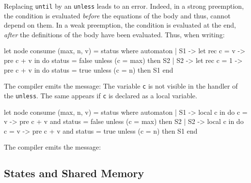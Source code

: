 \documentclass[11pt,titlepage,twoside]{report}
\makeatletter
\newenvironment{sample}
  {\@open{div}{\envclass@attr{zelusprompt}}
   \begin{alltt}}
  {\end{alltt}\@close{div}}
\newenvironment{sample}
  {\begin{flushright}\begin{minipage}[t]{15.3cm}\begin{alltt}\small}
  {\end{alltt}\end{minipage}\end{flushright}}
\makeatother
\begin{document}
Replacing \verb-until- by an \verb-unless- leads to an error. Indeed,
in a strong preemption, the condition is evaluated {\em before} the
equations of the body and thus, cannot depend on them. In a weak
preemption, the condition is evaluated at the end, {\em after} the
definitions of the body have been evaluated. Thus, when writing:
\begin{chklisting}[fail]
let node consume (max, n, v) = status where
  automaton
  | S1 ->
      let rec c = v -> pre c + v in
      do status = false
      unless (c = max) then S2
  | S2 ->
      let rec c = 1 -> pre c + v in
      do status = true
      unless (c = n) then S1
  end
\end{chklisting}
The compiler emits the message:
\chklistingerr{}
The variable \verb-c- is not visible in the handler of the \verb-unless-. The
same appears if \verb-c- is declared as a local variable.
\begin{chklisting}[fail]
let node consume (max, n, v) = status where
  automaton
  | S1 ->
      local c in
      do c = v -> pre c + v and status = false
      unless (c = max) then S2
  | S2 ->
      local c in
      do c = v -> pre c + v and status = true
      unless (c = n) then S1
  end
\end{chklisting}
The compiler emits the message:
\chklistingerr{}

\subsection{States and Shared Memory\label{stateshared}} %
\end{document}
